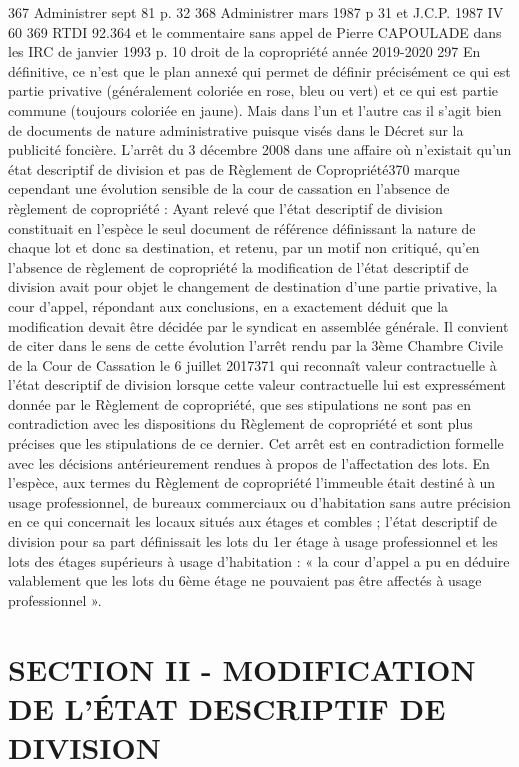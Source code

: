 		367 Administrer sept 81  p. 32
		368 Administrer mars 1987 p 31 et J.C.P. 1987 IV 60
		369 RTDI 92.364 et le commentaire sans appel de Pierre CAPOULADE dans les IRC de janvier 1993 p. 10
		droit de la copropriété année 2019-2020
		297
		En définitive, ce n’est que le plan annexé qui permet de définir précisément ce qui est partie privative (généralement coloriée en rose, bleu ou vert) et ce qui est partie commune (toujours coloriée en jaune).
		Mais dans l’un et l’autre cas il s’agit bien de documents de nature administrative puisque visés dans le Décret sur la publicité foncière.
		L’arrêt du 3 décembre 2008 dans une affaire où n’existait qu’un état descriptif de division et pas de Règlement de Copropriété370 marque cependant une évolution sensible de la cour de cassation en l’absence de règlement de copropriété :
		Ayant relevé que l'état descriptif de division constituait en l'espèce le seul document de référence définissant la nature de chaque lot et donc sa destination, et retenu, par un motif non critiqué, qu'en l'absence de règlement de copropriété la modification de l'état descriptif de division avait pour objet le changement de destination d'une partie privative, la cour d'appel, répondant aux conclusions, en a exactement déduit que la modification devait être décidée par le syndicat en assemblée générale.
		Il convient de citer dans le sens de cette évolution l’arrêt rendu par la 3ème Chambre Civile de la Cour de Cassation le 6 juillet 2017371 qui reconnaît valeur contractuelle à l’état descriptif de division lorsque cette valeur contractuelle lui est expressément donnée par le Règlement de copropriété, que ses stipulations ne sont pas en contradiction avec les dispositions du Règlement de copropriété et sont plus précises que les stipulations de ce dernier. Cet arrêt est en contradiction formelle avec les décisions antérieurement rendues à propos de l’affectation des lots.
		En l’espèce, aux termes du Règlement de copropriété l'immeuble était destiné à un usage professionnel, de bureaux commerciaux ou d'habitation sans autre précision en ce qui concernait les locaux situés aux étages et combles ; l’état descriptif de division pour sa part définissait les lots du 1er étage à usage professionnel et les lots des étages supérieurs à usage d’habitation : « la cour d’appel a pu en déduire valablement que les lots du 6ème étage ne pouvaient pas être affectés à usage professionnel ».
	
\section{SECTION II - MODIFICATION DE L’ÉTAT DESCRIPTIF DE DIVISION}
	
